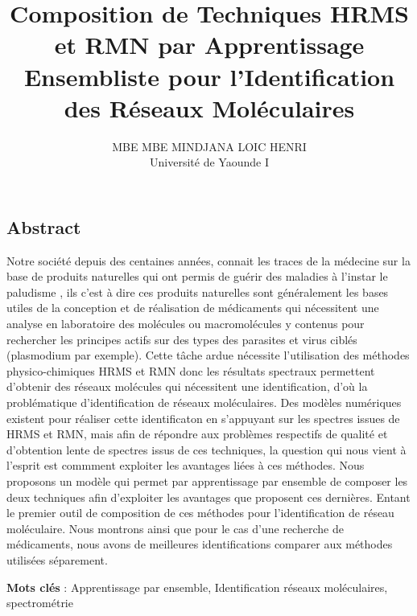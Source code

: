 \documentclass[letterpaper,twocolumn,10pt]{article}
\begin{document}
\date{}

\title{\Large \bf Composition de Techniques HRMS et RMN par Apprentissage Ensembliste pour l’Identification des Réseaux Moléculaires}

\author{
{\rm MBE MBE MINDJANA LOIC HENRI}\\
Université de Yaounde I}


\maketitle

\thispagestyle{empty}


\subsection*{Abstract}
Notre société depuis des centaines années, connait les traces de la médecine sur la
base de produits naturelles qui ont permis de guérir des maladies à l’instar le paludisme , ils
c’est à dire ces produits naturelles sont généralement les bases utiles de la conception et
de réalisation de médicaments qui nécessitent une analyse en laboratoire des molécules ou
macromolécules y contenus pour rechercher les principes actifs sur des types des parasites et
virus ciblés (plasmodium par exemple). Cette tâche ardue nécessite l’utilisation des
méthodes physico-chimiques HRMS et RMN donc les résultats spectraux permettent d'obtenir des réseaux molécules qui nécessitent une identification, d'où la problématique d'identification de réseaux moléculaires. Des modèles numériques existent pour réaliser cette identificaton en s'appuyant sur les spectres issues de HRMS et RMN, mais afin de répondre aux problèmes respectifs de qualité et d'obtention lente de spectres issus de ces techniques, la question qui nous vient à l'esprit est commment exploiter les avantages liées à ces méthodes. Nous proposons un modèle qui permet par apprentissage par ensemble de composer les deux techniques afin d'exploiter les avantages que proposent ces dernières. Entant le premier outil de composition de ces méthodes pour l'identification de réseau moléculaire. Nous montrons ainsi que pour le cas d'une recherche de médicaments, nous avons de meilleures identifications comparer aux méthodes utilisées séparement. 

\textbf{Mots clés} : Apprentissage par ensemble, Identification réseaux moléculaires, spectrométrie
\end{document}
